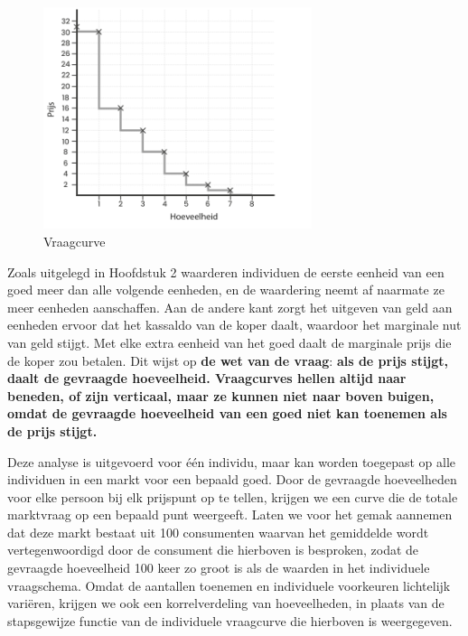 \begin{figure}[H]
\centering
    \includegraphics[width=0.7\textwidth]{figures/fig21-1.png}
    \caption[Vraagcurve]{Vraagcurve}
    \label{fig21}
\end{figure}

Zoals uitgelegd in Hoofdstuk 2 waarderen individuen de eerste eenheid van een goed meer dan alle volgende eenheden, en de waardering neemt af naarmate ze meer eenheden aanschaffen. Aan de andere kant zorgt het uitgeven van geld aan eenheden ervoor dat het kassaldo van de koper daalt, waardoor het marginale nut van geld stijgt. Met elke extra eenheid van het goed daalt de marginale prijs die de koper zou betalen. Dit wijst op \textbf{de wet van de vraag}: \textbf{als de prijs stijgt, daalt de gevraagde hoeveelheid. Vraagcurves hellen altijd naar beneden, of zijn verticaal, maar ze kunnen niet naar boven buigen, omdat de gevraagde hoeveelheid van een goed niet kan toenemen als de prijs stijgt.}

Deze analyse is uitgevoerd voor één individu, maar kan worden toegepast op alle individuen in een markt voor een bepaald goed. Door de gevraagde hoeveelheden voor elke persoon bij elk prijspunt op te tellen, krijgen we een curve die de totale marktvraag op een bepaald punt weergeeft. Laten we voor het gemak aannemen dat deze markt bestaat uit 100 consumenten waarvan het gemiddelde wordt vertegenwoordigd door de consument die hierboven is besproken, zodat de gevraagde hoeveelheid 100 keer zo groot is als de waarden in het individuele vraagschema. Omdat de aantallen toenemen en individuele voorkeuren lichtelijk variëren, krijgen we ook een korrelverdeling van hoeveelheden, in plaats van de stapsgewijze functie van de individuele vraagcurve die hierboven is weergegeven.

